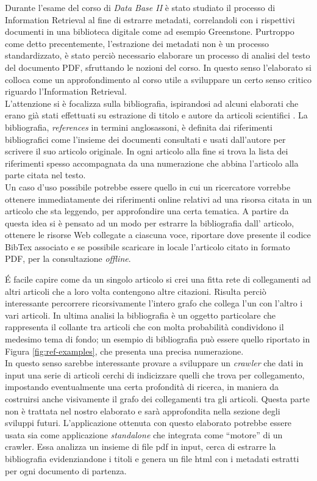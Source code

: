 Durante l'esame del corso di \textit{Data Base II} è stato studiato il processo di Information Retrieval al fine di estrarre metadati, correlandoli con i rispettivi documenti in una biblioteca digitale come ad esempio Greenstone. Purtroppo come detto precentemente, l'estrazione dei metadati non è un processo standardizzato, è stato perciò necessario elaborare un processo di analisi del testo del documento PDF, sfruttando le nozioni del corso. In questo senso l'elaborato si colloca come un approfondimento al corso utile a sviluppare un certo senso critico riguardo l'Information Retrieval.\\
L'attenzione si è focalizza sulla bibliografia, ispirandosi ad alcuni elaborati che erano già stati effettuati su estrazione di titolo e autore da articoli scientifici \cite{Tarocchi}. La bibliografia, \textit{references} in  termini anglosassoni, è definita dai riferimenti bibliografici come l'insieme dei documenti consultati e usati dall'autore per scrivere il suo articolo originale. In ogni articolo alla fine si trova la lista dei riferimenti spesso accompagnata da una numerazione che abbina l'articolo alla parte citata nel testo.
\\ 
Un caso d'uso possibile potrebbe essere quello in cui un ricercatore vorrebbe ottenere immediatamente dei riferimenti online relativi ad una risorsa citata in un articolo che sta leggendo, per approfondire una certa tematica. A partire da questa idea si è pensato ad un modo per estrarre la bibliografia dall' articolo, ottenere le risorse Web collegate a ciascuna voce, riportare dove presente il codice BibTex associato e se possibile scaricare in locale l'articolo citato in formato PDF, per la consultazione \textit{offline}.

\'E facile capire come da un singolo articolo si crei una fitta rete di collegamenti ad altri articoli che a loro volta contengono altre citazioni. Risulta perciò interessante percorrere ricorsivamente l'intero grafo che collega l'un con l'altro i vari articoli. In ultima analisi la bibliografia è un oggetto particolare che rappresenta il collante tra articoli che con molta probabilità condividono il medesimo tema di fondo; un esempio di bibliografia può essere quello riportato in Figura \ref{fig:ref-examples}, che presenta una precisa numerazione.
\\
In questo senso sarebbe interessante provare a sviluppare un \textit{crawler} che dati in input una serie di articoli cerchi di indicizzare quelli che trova per collegamento, impostando eventualmente una certa profondità di ricerca, in maniera da costruirsi anche visivamente il grafo dei collegamenti tra gli articoli. Questa parte non è trattata nel nostro elaborato e sarà approfondita nella sezione degli sviluppi futuri. L'applicazione ottenuta con questo elaborato potrebbe essere usata sia come applicazione \textit{standalone} che integrata come ``motore'' di un crawler. Essa analizza un insieme di file pdf in input, cerca di estrarre la bibliografia evidenziandone i titoli e genera un file html con i metadati estratti per ogni documento di partenza. 


